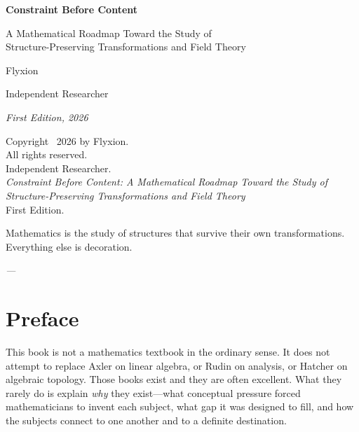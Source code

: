 \documentclass[12pt, twoside, openright, a4paper]{book}
\begin{document}
\frontmatter

\begin{titlepage}
\centering
\vspace*{2cm}
{\Huge\bfseries Constraint Before Content\par}
\vspace{1cm}
{\Large A Mathematical Roadmap Toward the Study of\\[4pt]
Structure-Preserving Transformations and Field Theory\par}
\vspace{2cm}
{\large Flyxion\par}
{\normalsize Independent Researcher\par}
\vfill
{\normalsize\itshape First Edition, 2026\par}
\end{titlepage}

\thispagestyle{empty}
\vspace*{\fill}
\noindent
Copyright \textcopyright\ 2026 by Flyxion.\\
All rights reserved.\\[6pt]
Independent Researcher.\\[6pt]
\textit{Constraint Before Content: A Mathematical Roadmap Toward the Study of
Structure-Preserving Transformations and Field Theory}\\[6pt]
First Edition.
\vspace*{\fill}
\newpage

\thispagestyle{empty}
\vspace*{3cm}
\epigraph{Mathematics is the study of structures that survive their own transformations.
Everything else is decoration.}{\textit{---}}
\vspace*{\fill}
\newpage

\tableofcontents

\chapter*{Preface}

This book is not a mathematics textbook in the ordinary sense.
It does not attempt to replace Axler on linear algebra, or Rudin on analysis, or Hatcher on algebraic topology.
Those books exist and they are often excellent.
What they rarely do is explain \emph{why} they exist---what conceptual pressure forced mathematicians to invent each subject, what gap it was designed to fill, and how the subjects connect to one another and to a definite destination.
\end{document}
